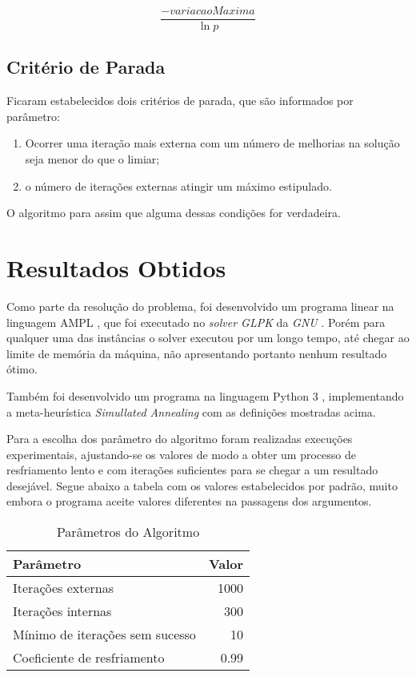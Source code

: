 \documentclass{article}
\begin{document}
\begin{displaymath}
\frac{-variacaoMaxima}{\ln p}
\end{displaymath}

\subsection{Critério de Parada}
Ficaram estabelecidos dois critérios de parada, que são informados por parâmetro:
\begin{enumerate}
\item Ocorrer uma iteração mais externa com um número de melhorias na solução seja menor do que o limiar;
\item o número de iterações externas atingir um máximo estipulado.
\end{enumerate}
O algoritmo para assim que alguma dessas condições for verdadeira.

\section{Resultados Obtidos}
Como parte da resolução do problema, foi desenvolvido um programa linear na linguagem AMPL \cite{AMPL}, que foi executado no \emph{solver GLPK} da \emph{GNU} \cite{GLPK}. Porém para qualquer uma das instâncias o solver executou por um longo tempo, até chegar ao limite de memória da máquina, não apresentando portanto nenhum resultado ótimo.

Também foi desenvolvido um programa na linguagem Python 3 \cite{PYTHON}, implementando a meta-heurística \emph{Simullated Annealing} com as definições mostradas acima.

Para a escolha dos parâmetro do algoritmo foram realizadas execuções experimentais, ajustando-se os valores de modo a obter um processo de resfriamento lento e com iterações suficientes para se chegar a um resultado desejável. Segue abaixo a tabela com os valores estabelecidos por padrão, muito embora o programa aceite valores diferentes na passagens dos argumentos.

\begin{table}[H]
\centering
\begin{tabular}{|l | r |}
	\hline
	\textbf{Parâmetro} & \textbf{Valor} \\ \hline
	Iterações externas		& 1000	\\ \hline
	Iterações internas		& 300	\\ \hline
	Mínimo de iterações sem sucesso	& 10 	\\ \hline
	Coeficiente de resfriamento		& 0.99	\\ \hline
\end{tabular}
\caption{Parâmetros do Algoritmo}
\label{tab:Parametros}
\end{table}
\end{document}
